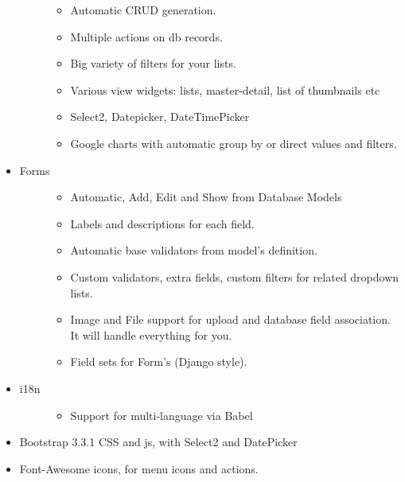 \documentclass[letterpaper,10pt,english]{sphinxmanual}
\begin{document}
\begin{itemize}
\begin{description}
\begin{itemize}
\item {} 
Automatic CRUD generation.

\item {} 
Multiple actions on db records.

\item {} 
Big variety of filters for your lists.

\item {} 
Various view widgets: lists, master-detail, list of thumbnails etc

\item {} 
Select2, Datepicker, DateTimePicker

\item {} 
Google charts with automatic group by or direct values and filters.

\end{itemize}

\end{description}

\item {} \begin{description}
\item[{Forms}] \leavevmode\begin{itemize}
\item {} 
Automatic, Add, Edit and Show from Database Models

\item {} 
Labels and descriptions for each field.

\item {} 
Automatic base validators from model's definition.

\item {} 
Custom validators, extra fields, custom filters for related dropdown lists.

\item {} 
Image and File support for upload and database field association. It will handle everything for you.

\item {} 
Field sets for Form's (Django style).

\end{itemize}

\end{description}

\item {} \begin{description}
\item[{i18n}] \leavevmode\begin{itemize}
\item {} 
Support for multi-language via Babel

\end{itemize}

\end{description}

\item {} 
Bootstrap 3.3.1 CSS and js, with Select2 and DatePicker

\item {} 
Font-Awesome icons, for menu icons and actions.

\end{itemize}
\end{document}
